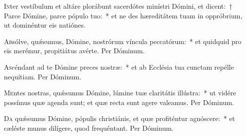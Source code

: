 \documentclass[vesperale_romanum.tex]{subfiles}
\begin{document}

\newpage
{}


\lettrine{I}{n}ter vestíbulum et altáre plorábunt sacerdótes minístri Dómini, et dicent:~† Parce Dómine, parce pópulo tuo:~* et ne des hæreditátem tuam in oppróbrium, ut dominéntur eis natiónes.





\oratio

\lettrine{A}{b}sólve, quǽsumus, Dómine, nostrórum víncula peccatórum:~* et quidquid pro eis merémur, propitiátus avérte.
Per Dóminum.




\oratio

\lettrine{A}{s}céndant ad te Dómine preces nostræ:~* et ab Ecclésia tua cunctam repélle nequítiam. Per Dóminum.



\oratio

\lettrine{M}{e}ntes nostras, quǽsumus Dómine, lúmine tuæ claritátis illústra:~* ut vidére possímus quæ agenda sunt; et quæ recta sunt agere valeamus. Per Dóminum.



\oratio

\lettrine{D}{a} quǽsumus Dómine, pópulis christiánis, et quæ profiténtur agnóscere:~* et cæléste munus dilígere, quod frequéntant. Per Dóminum.


\end{document}
